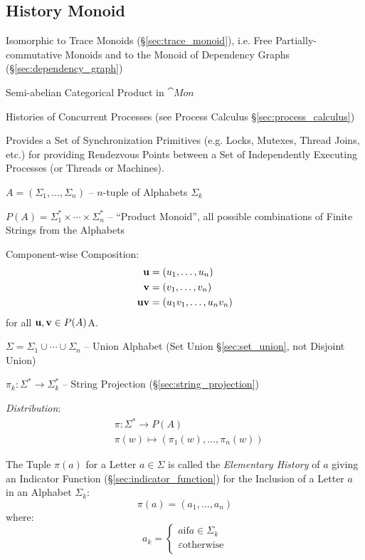 \subsection{History Monoid}\label{sec:history_monoid}

Isomorphic to Trace Monoids (\S\ref{sec:trace_monoid}), i.e. Free
Partially-commutative Monoids and to the Monoid of Dependency Graphs
(\S\ref{sec:dependency_graph})

Semi-abelian Categorical Product in $\cat{Mon}$

Histories of Concurrent Processes (see Process Calculus
\S\ref{sec:process_calculus})

Provides a Set of Synchronization Primitives (e.g. Locks, Mutexes,
Thread Joins, etc.) for providing Rendezvous Points between a Set of
Independently Executing Processes (or Threads or Machines).

$A = (\Sigma_1, \ldots, \Sigma_n)$ -- $n$-tuple of Alphabets
$\Sigma_k$

$P(A) = \Sigma_1^* \times \cdots \times \Sigma_n^*$ -- ``Product
Monoid'', all possible combinations of Finite Strings from the
Alphabets %

Component-wise Composition:
\begin{align*}
  \mathbf{u} &= (u_1, \ldots, u_n) \\
  \mathbf{v} &= (v_1, \ldots, v_n) \\
  \mathbf{uv} &= (u_1 v_1, \ldots, u_n v_n)
\end{align*}
for all $\mathbf{u},\mathbf{v} \in P(A)$A.

$\Sigma = \Sigma_1 \cup \cdots \cup \Sigma_n$ -- Union Alphabet (Set
Union \S\ref{sec:set_union}, not Disjoint Union)

$\pi_k : \Sigma^* \rightarrow \Sigma_k^*$ -- String Projection
(\S\ref{sec:string_projection})

\emph{Distribution}:
\begin{align*}
  & \pi : \Sigma^* \rightarrow P(A) \\
  & \pi(w) \mapsto (\pi_1(w), \ldots, \pi_n(w))
\end{align*}

The Tuple $\pi(a)$ for a Letter $a \in \Sigma$ is called the
\emph{Elementary History} of $a$ giving an Indicator Function
(\S\ref{sec:indicator_function}) for the Inclusion of a Letter $a$ in
an Alphabet $\Sigma_k$:
\[
  \pi(a) = (a_1, \ldots, a_n)
\]
where:
\[
  a_k =
  \begin{cases}
    a \text{if} a \in \Sigma_k \\
    \varepsilon \text{otherwise} \\
  \end{cases}
\]

